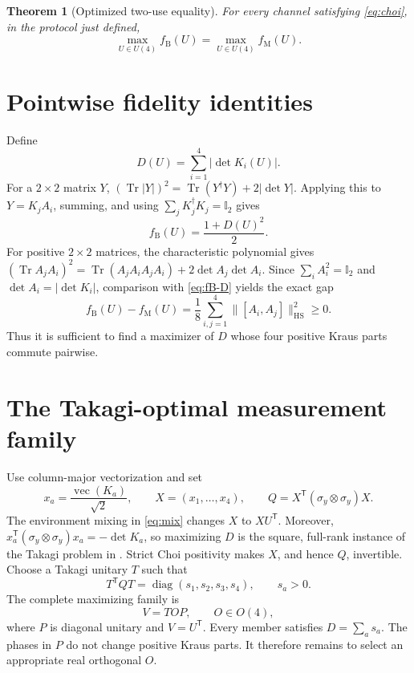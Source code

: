 \documentclass[11pt]{article}
\newtheorem{theorem}{Theorem}
\theoremstyle{remark}
\newcommand{\Tr}{\operatorname{Tr}}
\newcommand{\diag}{\operatorname{diag}}
\newcommand{\1}{\mathbb{I}}
\newcommand{\HS}{\mathrm{HS}}
\newcommand{\M}{\mathrm{M}}
\newcommand{\B}{\mathrm{B}}
\begin{document}
\begin{theorem}[Optimized two-use equality]
\label{thm:main}
For every channel satisfying \cref{eq:choi}, in the protocol just defined,
\begin{equation}
 \max_{U\in U(4)}f_{\B}(U)=\max_{U\in U(4)}f_{\M}(U).
 \label{eq:main}
\end{equation}
\end{theorem}

\section{Pointwise fidelity identities}
\label{sec:pointwise}

Define
\begin{equation}
 D(U)=\sum_{i=1}^{4}|\det K_i(U)|.
\end{equation}
For a $2\times2$ matrix $Y$,
$(\Tr|Y|)^2=\Tr(Y^\dagger Y)+2|\det Y|$.  Applying this to
$Y=K_jA_i$, summing, and using $\sum_jK_j^\dagger K_j=\1_2$ gives
\begin{equation}
 f_{\B}(U)=\frac{1+D(U)^2}{2}.
 \label{eq:fB-D}
\end{equation}
For positive $2\times2$ matrices, the characteristic polynomial gives
$(\Tr A_jA_i)^2=\Tr(A_jA_iA_jA_i)+2\det A_j\det A_i$.
Since $\sum_iA_i^2=\1_2$ and $\det A_i=|\det K_i|$, comparison with
\cref{eq:fB-D} yields the exact gap
\begin{equation}
 f_{\B}(U)-f_{\M}(U)
 =\frac18\sum_{i,j=1}^{4}\|[A_i,A_j]\|_{\HS}^{2}\geq0 .
 \label{eq:gap}
\end{equation}
Thus it is sufficient to find a maximizer of $D$ whose four positive Kraus
parts commute pairwise.

\section{The Takagi-optimal measurement family}
\label{sec:takagi}

Use column-major vectorization and set
\begin{equation}
 x_a=\frac{\operatorname{vec}(K_a)}{\sqrt2},\qquad
 X=(x_1,\ldots,x_4),\qquad
 Q=X^{\mathsf T}(\sigma_y\otimes\sigma_y)X .
 \label{eq:Q}
\end{equation}
The environment mixing in \cref{eq:mix} changes $X$ to $XU^{\mathsf T}$.
Moreover,
$x_a^{\mathsf T}(\sigma_y\otimes\sigma_y)x_a=-\det K_a$, so maximizing
$D$ is the square, full-rank instance of the Takagi problem in
\cite{LaustsenEtAl2003}.  Strict Choi positivity makes $X$, and hence $Q$,
invertible.  Choose a Takagi unitary $T$ such that
\begin{equation}
 T^{\mathsf T}QT=\diag(s_1,s_2,s_3,s_4),\qquad s_a>0.
\end{equation}
The complete maximizing family is
\begin{equation}
 V=TOP,\qquad O\in O(4),
 \label{eq:TOP}
\end{equation}
where $P$ is diagonal unitary and $V=U^{\mathsf T}$.  Every member satisfies
$D=\sum_as_a$.  The phases in $P$ do not change positive Kraus parts.  It
therefore remains to select an appropriate real orthogonal $O$.
\end{document}
